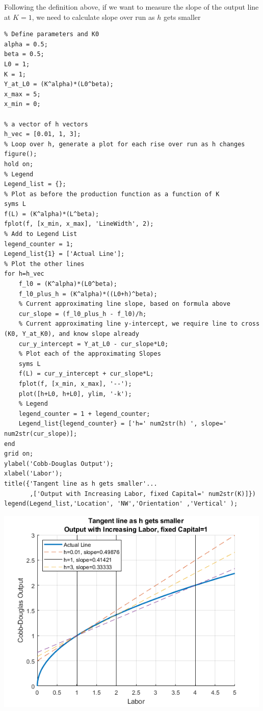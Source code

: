 \documentclass[
]{book}
\begin{document}
Following the definition above, if we want to measure the slope of the
output line at \(K=1\), we need to calculate slope over run as \(h\) gets
smaller

\begin{verbatim}
% Define parameters and K0
alpha = 0.5;
beta = 0.5;
L0 = 1;
K = 1;
Y_at_L0 = (K^alpha)*(L0^beta);
x_max = 5;
x_min = 0;

% a vector of h vectors
h_vec = [0.01, 1, 3];
% Loop over h, generate a plot for each rise over run as h changes
figure();
hold on;
% Legend
Legend_list = {};
% Plot as before the production function as a function of K
syms L
f(L) = (K^alpha)*(L^beta);
fplot(f, [x_min, x_max], 'LineWidth', 2);
% Add to Legend List
legend_counter = 1;
Legend_list{1} = ['Actual Line'];
% Plot the other lines
for h=h_vec
    f_l0 = (K^alpha)*(L0^beta);
    f_l0_plus_h = (K^alpha)*((L0+h)^beta);
    % Current approximating line slope, based on formula above
    cur_slope = (f_l0_plus_h - f_l0)/h;
    % Current approximating line y-intercept, we require line to cross (K0, Y_at_K0), and know slope already
    cur_y_intercept = Y_at_L0 - cur_slope*L0;
    % Plot each of the approximating Slopes
    syms L
    f(L) = cur_y_intercept + cur_slope*L;
    fplot(f, [x_min, x_max], '--');
    plot([h+L0, h+L0], ylim, '-k');
    % Legend
    legend_counter = 1 + legend_counter;
    Legend_list{legend_counter} = ['h=' num2str(h) ', slope=' num2str(cur_slope)];
end
grid on;
ylabel('Cobb-Douglas Output');
xlabel('Labor');
title({'Tangent line as h gets smaller'...
       ,['Output with Increasing Labor, fixed Capital=' num2str(K)]})
legend(Legend_list,'Location', 'NW','Orientation' ,'Vertical' );
\end{verbatim}

\includegraphics[width=5.20833in,height=\textheight]{img/derivative_hslope_cobb_douglas_images/figure_1.png}
\end{document}
